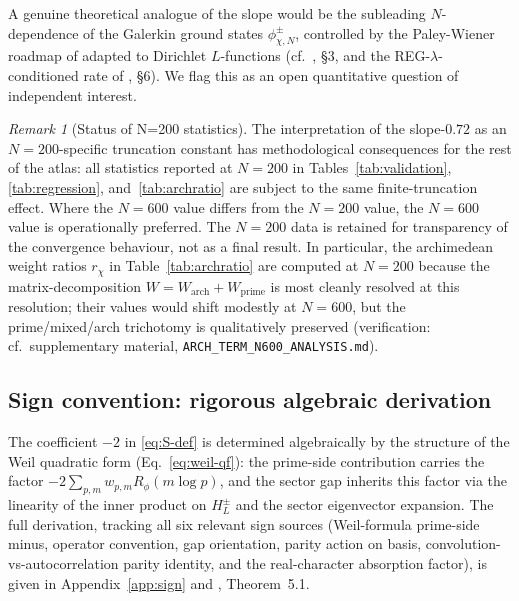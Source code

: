 \documentclass[10pt,twocolumn]{article}
\theoremstyle{definition}
\theoremstyle{remark}
\newtheorem{remark}[theorem]{Remark}
\newcommand{\chifn}{\chi}
\begin{document}
A genuine theoretical analogue of the slope would be the
subleading $N$-dependence of the Galerkin ground states
$\phi^\pm_{\chifn,N}$, controlled by the Paley-Wiener roadmap of
\cite{RH_II} adapted to Dirichlet $L$-functions (cf.\
\cite{AnalyticGroundstate}, \S3, and the REG-$\lambda$-conditioned
rate of \cite{RH_II}, \S6). We flag this as an open quantitative
question of independent interest.

\begin{remark}[Status of N=200 statistics]
\label{rem:n200-status}
The interpretation of the slope-$0.72$ as an $N=200$-specific
truncation constant has methodological consequences for the rest of
the atlas: all statistics reported at $N=200$ in
Tables~\ref{tab:validation}, \ref{tab:regression},
and~\ref{tab:archratio} are subject to the same finite-truncation
effect. Where the $N=600$ value differs from the $N=200$ value, the
$N=600$ value is operationally preferred. The $N=200$ data is
retained for transparency of the convergence behaviour, not as a
final result. In particular, the archimedean weight ratios
$r_\chi$ in Table~\ref{tab:archratio} are computed at $N=200$
because the matrix-decomposition $W=W_{\mathrm{arch}}+W_{\mathrm{prime}}$
is most cleanly resolved at this resolution; their values would
shift modestly at $N=600$, but the prime/mixed/arch trichotomy is
qualitatively preserved (verification: cf.\ supplementary material,
\texttt{ARCH\_TERM\_N600\_ANALYSIS.md}).
\end{remark}

\subsection{Sign convention: rigorous algebraic derivation}
\label{sec:discussion-sign}

The coefficient $-2$ in \eqref{eq:S-def} is determined algebraically
by the structure of the Weil quadratic form (Eq.~\eqref{eq:weil-qf}):
the prime-side contribution carries the factor
$-2\sum_{p,m}w_{p,m}R_\phi(m\log p)$, and the sector gap inherits this
factor via the linearity of the inner product on $H_L^\pm$ and the
sector eigenvector expansion. The full derivation, tracking all six
relevant sign sources (Weil-formula prime-side minus, operator
convention, gap orientation, parity action on basis,
convolution-vs-autocorrelation parity identity, and the real-character
absorption factor), is given in Appendix~\ref{app:sign} and
\cite{AnalyticKernelV2}, Theorem~5.1.
\end{document}
